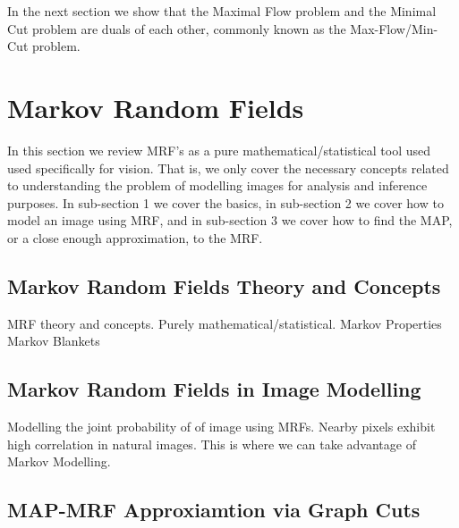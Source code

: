 In the next section we show that the Maximal Flow problem and the Minimal Cut problem are duals of each other, commonly known as the Max-Flow/Min-Cut problem.


\section{Markov Random Fields}
\label{sec:MarkovRandomFields}

In this section we review MRF's as a pure mathematical/statistical tool used used specifically for vision. That is, we only cover the necessary concepts related to understanding 
the problem of modelling images for analysis and inference purposes. In sub-section 1 we cover the basics, in sub-section 2 we cover how to model an image using MRF, and 
in sub-section 3 we cover how to find the MAP, or a close enough approximation, to the MRF.


\subsection{Markov Random Fields Theory and Concepts}

MRF theory and concepts. Purely mathematical/statistical.
Markov Properties\\
Markov Blankets


\subsection{Markov Random Fields in Image Modelling}

Modelling the joint probability of of image using MRFs.
Nearby pixels exhibit high correlation in natural images. This is where we can take advantage of Markov Modelling.


\subsection{MAP-MRF Approxiamtion via Graph Cuts}

